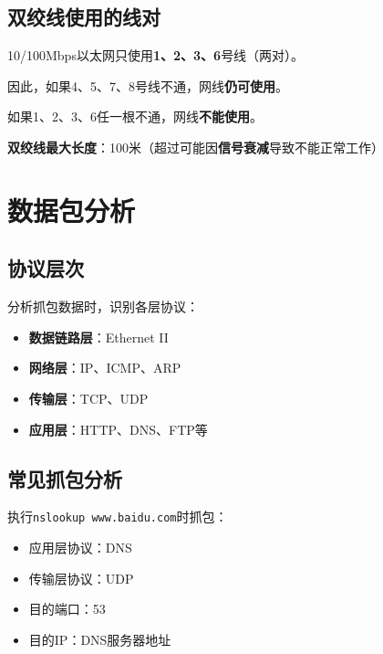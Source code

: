 \documentclass[12pt,a4paper]{ctexart}
\begin{document}
\subsection{双绞线使用的线对}

\begin{keybox}
10/100Mbps以太网只使用\textbf{1、2、3、6}号线（两对）。

因此，如果4、5、7、8号线不通，网线\textbf{仍可使用}。

如果1、2、3、6任一根不通，网线\textbf{不能使用}。

\textbf{双绞线最大长度}：100米（超过可能因\textbf{信号衰减}导致不能正常工作）
\end{keybox}

\section{数据包分析}

\subsection{协议层次}

\begin{keybox}
分析抓包数据时，识别各层协议：
\begin{itemize}[itemsep=0pt]
    \item \textbf{数据链路层}：Ethernet II
    \item \textbf{网络层}：IP、ICMP、ARP
    \item \textbf{传输层}：TCP、UDP
    \item \textbf{应用层}：HTTP、DNS、FTP等
\end{itemize}
\end{keybox}

\subsection{常见抓包分析}

\begin{exambox}[DNS查询分析]
执行\texttt{nslookup www.baidu.com}时抓包：
\begin{itemize}[itemsep=0pt]
    \item 应用层协议：DNS
    \item 传输层协议：UDP
    \item 目的端口：53
    \item 目的IP：DNS服务器地址
\end{itemize}
\end{exambox}
\end{document}
